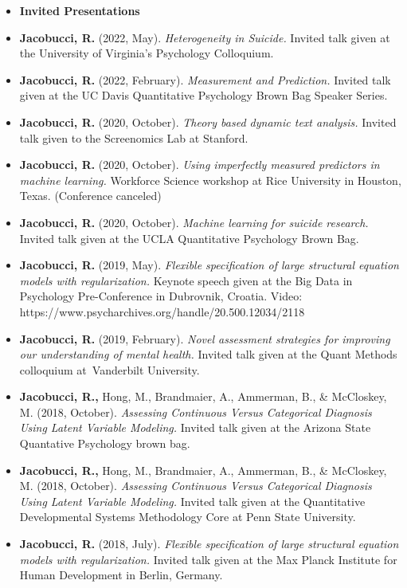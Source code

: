 \documentclass[letterpaper,10pt]{article}
\begin{document}
\begin{itemize}
	\item {\textbf{\large{Invited Presentations}}}
	\item[]\textbf{Jacobucci, R.} (2022, May). \emph{Heterogeneity in Suicide.} Invited talk given at the University of Virginia's Psychology Colloquium.
	\item[]\textbf{Jacobucci, R.} (2022, February). \emph{Measurement and Prediction.} Invited talk given at the UC Davis Quantitative Psychology Brown Bag Speaker Series.
	\item[]\textbf{Jacobucci, R.} (2020, October). \emph{Theory based dynamic text analysis.} Invited talk given to the Screenomics Lab at Stanford.
	\item[]\textbf{Jacobucci, R.} (2020, October). \emph{Using imperfectly measured predictors in machine learning.} Workforce Science workshop at Rice University in Houston, Texas. (Conference canceled)
	\item[]\textbf{Jacobucci, R.} (2020, October). \emph{Machine learning for suicide research.} Invited talk given at the UCLA Quantitative Psychology Brown Bag.
	\item[]\textbf{Jacobucci, R.} (2019, May). \emph{Flexible specification of large structural equation models with regularization.} Keynote speech given at the Big Data in Psychology Pre-Conference in Dubrovnik, Croatia. Video: https://www.psycharchives.org/handle/20.500.12034/2118
	\item[]\textbf{Jacobucci, R.} (2019, February). \emph{Novel assessment strategies for improving our understanding of mental health.} Invited talk given at the Quant Methods colloquium at Vanderbilt University.
	\item[]\textbf{Jacobucci, R.,} Hong, M., Brandmaier, A., Ammerman, B., \& McCloskey, M. (2018, October). \emph{Assessing Continuous Versus Categorical Diagnosis Using Latent Variable Modeling.} Invited talk given at the Arizona State Quantative Psychology brown bag.
	\item[]\textbf{Jacobucci, R.,} Hong, M., Brandmaier, A., Ammerman, B., \& McCloskey, M. (2018, October). \emph{Assessing Continuous Versus Categorical Diagnosis Using Latent Variable Modeling.} Invited talk given at the Quantitative Developmental Systems Methodology Core at Penn State University.
	\item[]\textbf{Jacobucci, R.} (2018, July). \emph{Flexible specification of large structural equation models with regularization.} Invited talk given at the Max Planck Institute for Human Development in Berlin, Germany.
	

\end{itemize}
\end{document}
